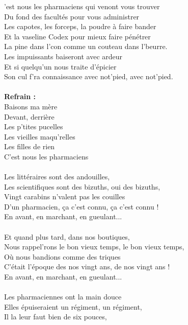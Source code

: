
'est nous les pharmaciens qui venont vous trouver
\\Du fond des facultés pour vous administrer
\\Les capotes, les forceps, la poudre à faire bander
\\Et la vaseline Codex pour mieux faire pénétrer
\\La pine dans l'con comme un couteau dans l'beurre.
\\Les impuissants baiseront avec ardeur
\\Et si quelqu'un nous traite d'épicier
\\Son cul f'ra connaissance avec not'pied, avec not'pied.
\\\\\textbf{Refrain :}
\\Baisons ma mère
\\Devant, derrière
\\Les p'tites pucelles
\\Les vieilles maqu'relles
\\Les filles de rien
\\C'est nous les pharmaciens
\\\\Les littéraires sont des andouilles,
\\Les scientifiques sont des bizuths, oui des bizuths,
\\Vingt carabins n'valent pas les couilles
\\D'un pharmacien, ça c'est connu, ça c'est connu !
\\En avant, en marchant, en gueulant...
\\\\Et quand plus tard, dans nos boutiques,
\\Nous rappel'rons le bon vieux temps, le bon vieux temps,
\\Où nous bandions comme des triques
\\C'était l'époque des nos vingt ans, de nos vingt ans !
\\En avant, en marchant, en gueulant...
\\\\Les pharmaciennes ont la main douce
\\Elles épuiseraient un régiment, un régiment,
\\Il la leur faut bien de six pouces,
